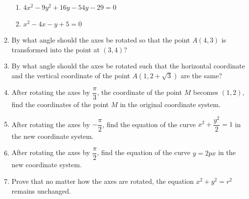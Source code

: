 \documentclass{report}
\begin{document}
\begin{enumerate}[leftmargin=*]
\begin{enumerate}
              \item $4x^2 - 9y^2 + 16y - 54y - 29 = 0$
              \item $x^2 - 4x - y + 5 = 0$
          \end{enumerate}
    \item By what angle should the axes be rotated so that the point $A(4, 3)$ is
          transformed into the point at $(3, 4)$?
    \item By what angle should the axes be rotated such that the horizontal coordinate
          and the vertical coordinate of the point $A(1, 2+\sqrt{3})$ are the same?
    \item After rotating the axes by $\dfrac{\pi}{3}$, the coordinate of the point $M$
          becomes $(1, 2)$, find the coordinates of the point $M$ in the original
          coordinate system.
    \item After rotating the axes by $-\dfrac{\pi}{2}$, find the equation of the curve
          $x^2 + \dfrac{y^2}{2} = 1$ in the new coordinate system.
    \item After rotating the axes by $\dfrac{\pi}{2}$, find the equation of the curve $y
              = 2px$ in the new coordinate system.
    \item Prove that no matter how the axes are rotated, the equation $x^2 + y^2 = r^2$
          remains unchanged.
\end{enumerate}
\end{document}
